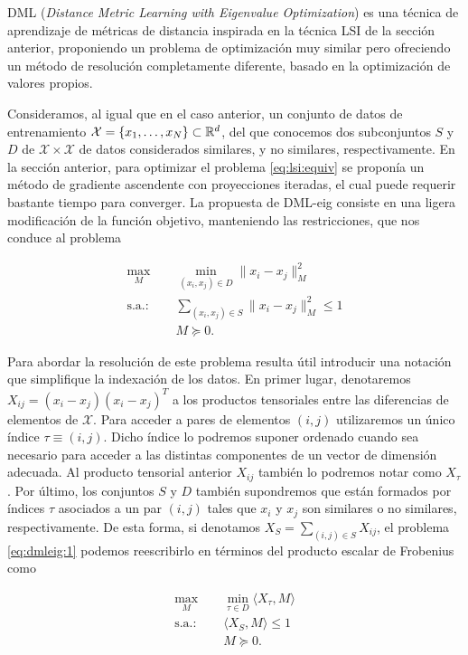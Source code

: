 \documentclass{book}
\begin{document}
DML (\emph{Distance Metric Learning with Eigenvalue Optimization}) \cite{dmleig} es una técnica de aprendizaje de métricas de distancia inspirada en la técnica LSI de la sección anterior, proponiendo un problema de optimización muy similar pero ofreciendo un método de resolución completamente diferente, basado en la optimización de valores propios.

Consideramos, al igual que en el caso anterior, un conjunto de datos de entrenamiento $\mathcal{X} = \{x_1,\dots,x_N\} \subset \mathbb{R}^d$, del que conocemos dos subconjuntos $S$ y $D$ de $\mathcal{X}\times\mathcal{X}$ de datos considerados similares, y no similares, respectivamente. En la sección anterior, para optimizar el problema \ref{eq:lsi:equiv} se proponía un método de gradiente ascendente con proyecciones iteradas, el cual puede requerir bastante tiempo para converger. La propuesta de DML-eig consiste en una ligera modificación de la función objetivo, manteniendo las restricciones, que nos conduce al problema

\begin{equation} \label{eq:dmleig:1}
\begin{split}
	\max_{M} &\quad \min_{(x_i,x_j)\in D}  \|x_i - x_j \|_M^2 \\
	\text{s.a.: } &\quad \sum_{(x_i,x_j) \in S} \|x_i - x_j\|_M^2 \le 1 \\
				  &\quad M \succeq 0.
\end{split}
\end{equation}

Para abordar la resolución de este problema resulta útil introducir una notación que simplifique la indexación de los datos. En primer lugar, denotaremos $X_{ij} = (x_i-x_j)(x_i-x_j)^T$ a los productos tensoriales entre las diferencias de elementos de $\mathcal{X}$. Para acceder a pares de elementos $(i,j)$ utilizaremos un único índice $\tau \equiv (i,j)$. Dicho índice lo podremos suponer ordenado cuando sea necesario para acceder a las distintas componentes de un vector de dimensión adecuada. Al producto tensorial anterior $X_{ij}$ también lo podremos notar como $X_{\tau}$. Por último, los conjuntos $S$ y $D$ también supondremos que están formados por índices $\tau$ asociados a un par $(i,j)$ tales que $x_i$ y $x_j$ son similares o no similares, respectivamente. De esta forma, si denotamos $X_S = \sum_{(i,j)\in S}X_{ij}$, el problema \ref{eq:dmleig:1} podemos reescribirlo en términos del producto escalar de Frobenius como

\begin{equation} \label{eq:dmleig:2}
\begin{split}
	\max_{M} &\quad \min_{\tau \in D}  \langle X_{\tau}, M \rangle \\
	\text{s.a.: } &\quad \langle X_S, M \rangle \le 1 \\
				  &\quad M \succeq 0.
\end{split}
\end{equation}
\end{document}
